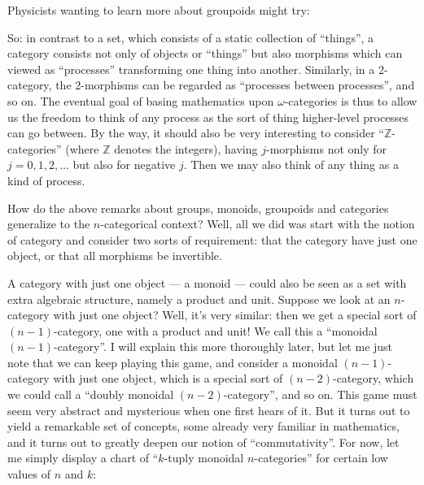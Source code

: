 \documentclass{article}
\def\tightlist{}
\renewcommand{\texttt}[1]{%
  \begingroup
  \ttfamily
  \begingroup\lccode`~=`/\lowercase{\endgroup\def~}{/\discretionary{}{}{}}%
  \begingroup\lccode`~=`[\lowercase{\endgroup\def~}{[\discretionary{}{}{}}%
  \begingroup\lccode`~=`.\lowercase{\endgroup\def~}{.\discretionary{}{}{}}%
  \catcode`/=\active\catcode`[=\active\catcode`.=\active
  \scantokens{#1\noexpand}%
  \endgroup
}
\begin{document}
Physicists wanting to learn more about groupoids might try:


So: in contrast to a set, which consists of a static collection of
``things'', a category consists not only of objects or ``things'' but
also morphisms which can viewed as ``processes'' transforming one thing
into another. Similarly, in a 2-category, the 2-morphisms can be
regarded as ``processes between processes'', and so on. The eventual
goal of basing mathematics upon \(\omega\)-categories is thus to allow
us the freedom to think of any process as the sort of thing higher-level
processes can go between. By the way, it should also be very interesting
to consider ``\(\mathbb{Z}\)-categories'' (where \(\mathbb{Z}\) denotes
the integers), having \(j\)-morphisms not only for \(j = 0,1,2,\ldots\)
but also for negative \(j\). Then we may also think of any thing as a
kind of process.

How do the above remarks about groups, monoids, groupoids and categories
generalize to the \(n\)-categorical context? Well, all we did was start
with the notion of category and consider two sorts of requirement: that
the category have just one object, or that all morphisms be invertible.

A category with just one object --- a monoid --- could also be seen as a
set with extra algebraic structure, namely a product and unit. Suppose
we look at an \(n\)-category with just one object? Well, it's very
similar: then we get a special sort of \((n-1)\)-category, one with a
product and unit! We call this a ``monoidal \((n-1)\)-category''. I will
explain this more thoroughly later, but let me just note that we can
keep playing this game, and consider a monoidal \((n-1)\)-category with
just one object, which is a special sort of \((n-2)\)-category, which we
could call a ``doubly monoidal \((n-2)\)-category'', and so on. This
game must seem very abstract and mysterious when one first hears of it.
But it turns out to yield a remarkable set of concepts, some already
very familiar in mathematics, and it turns out to greatly deepen our
notion of ``commutativity''. For now, let me simply display a chart of
``\(k\)-tuply monoidal \(n\)-categories'' for certain low values of
\(n\) and \(k\):
\end{document}
